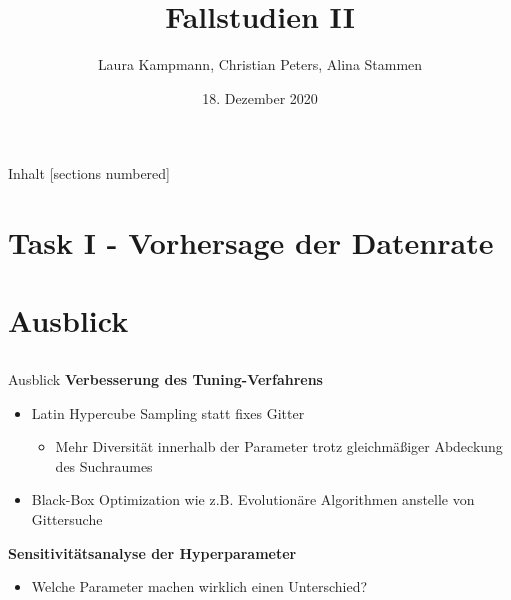 \documentclass[10pt]{beamer}
\title{Fallstudien II}
\date{18. Dezember 2020}
\author{Laura Kampmann, Christian Peters, Alina Stammen}
\begin{document}
\maketitle

\begin{frame}{Inhalt}
  [sections numbered]
  \tableofcontents
\end{frame}

%

%

\section{Task I - Vorhersage der Datenrate}









%

\section{Ausblick}

\subsection*{}

\begin{frame}{Ausblick}
    \textbf{Verbesserung des Tuning-Verfahrens}
    \begin{itemize}
        \item Latin Hypercube Sampling statt fixes Gitter
        \begin{itemize}
            \item Mehr Diversit\"at innerhalb der Parameter trotz gleichm\"a{\ss}iger Abdeckung des Suchraumes
        \end{itemize}
        \item Black-Box Optimization wie z.B. Evolution\"are Algorithmen anstelle von Gittersuche
    \end{itemize}
    \textbf{Sensitivit\"atsanalyse der Hyperparameter}
    \begin{itemize}
        \item Welche Parameter machen wirklich einen Unterschied?
    \end{itemize}
\end{frame}
\end{document}
